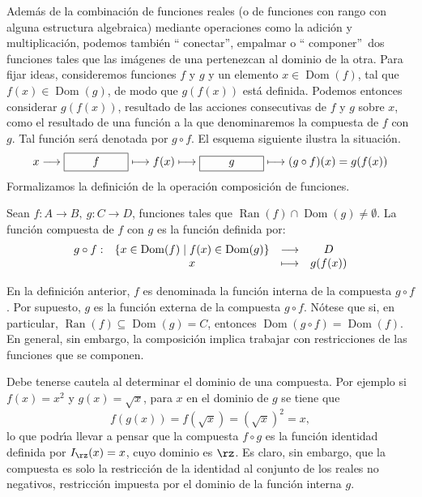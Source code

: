 Adem\'{a}s de la combinaci\'{o}n de funciones reales (o de funciones con rango
con alguna estructura algebraica) mediante operaciones como la adici\'{o}n y
multiplicaci\'{o}n, podemos tambi\'{e}n \textquotedblleft
conectar\textquotedblright, empalmar o \textquotedblleft
componer\textquotedblright\ dos funciones tales que las im\'{a}genes de una
pertenezcan al dominio de la otra. Para fijar ideas, consideremos funciones
$f$ y $g$ y un elemento $x\in\operatorname*{Dom}(f)$, tal que $f(x)\in
\operatorname*{Dom}(g)$, de modo que $g(f(x))$ est\'{a} definida. Podemos
entonces considerar $g(f(x))$, resultado de las acciones consecutivas de $f$ y
$g$ sobre $x$, como el resultado de una funci\'{o}n a la que denominaremos la
%
compuesta de $f$ con $g$. Tal funci\'{o}n ser\'{a} denotada por $g\circ f$. El
esquema siguiente ilustra la situaci\'{o}n.
\[
x\longrightarrow\framebox[2cm]{$f$}\longmapsto f(x)\longmapsto
\framebox[2cm]{$g$}\longmapsto(g\circ f)(x)=g(f(x))
\]
Formalizamos la definici\'{o}n de la operaci\'{o}n composici\'{o}n de funciones.

\begin{definition}
Sean $f:A\longrightarrow B,\ g:C\longrightarrow D$, funciones tales que
$\operatorname*{Ran}(f)\cap\operatorname*{Dom}(g)\neq\emptyset$. La
funci\'{o}n compuesta de $f$ con $g$ es la funci\'{o}n definida por:
\[%
\begin{array}
[c]{cccc}%
\label{compuesta}g\circ f: & \{x\in\operatorname*{Dom}(f)\mid f(x)\in
\operatorname*{Dom}(g)\} & \longrightarrow & D\\
& x & \longmapsto & g(f(x))
\end{array}
\]

\end{definition}

En la definici\'{o}n
%
anterior, $f$ es denominada la
%
funci\'{o}n interna de la compuesta $g\circ f$. Por supuesto, $g$ es la
funci\'{o}n%
externa de la compuesta $g\circ f$. N\'{o}tese que si, en particular,
$\operatorname*{Ran}(f)\subseteq\operatorname*{Dom}(g)=C$, entonces
$\operatorname*{Dom}(g\circ f)=\operatorname*{Dom}(f)$. En general, sin
embargo, la composici\'{o}n implica trabajar con restricciones de las
funciones que se componen.

\begin{example}
Debe tenerse cautela al determinar el dominio de una compuesta. Por ejemplo si
$f(x)=x^{2}$ y $g(x)=\sqrt{x}$, para $x$ en el dominio de $g$ se tiene que%
\[
f(g(x))=f(\sqrt{x})=(\sqrt{x})^{2}=x,
\]
lo que podr\'{\i}a llevar a pensar que la compuesta $f\circ g$ es la
funci\'{o}n identidad definida por $I_{\rz}(x)=x$, cuyo dominio es $\rz$. Es
claro, sin embargo, que la compuesta es solo la restricci\'{o}n de la
identidad al conjunto de los reales no negativos, restricci\'{o}n impuesta por
el dominio de la funci\'{o}n interna $g$.
\end{example}

